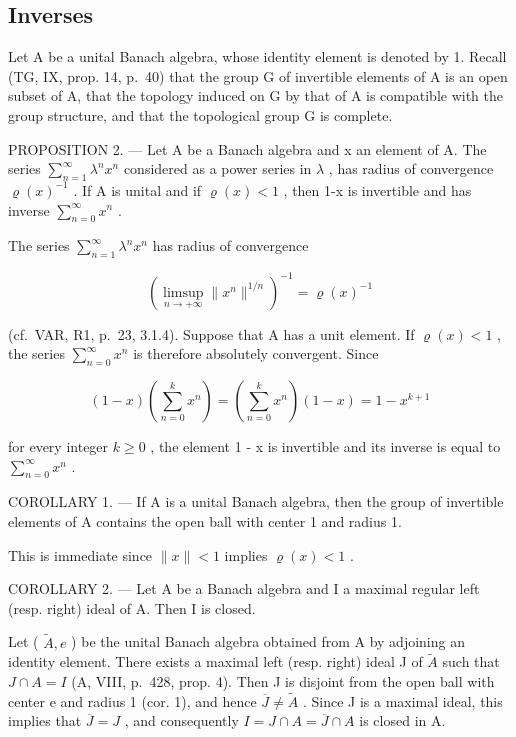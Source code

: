 \subsection{Inverses}

Let A be a unital Banach algebra, whose identity element is denoted by 1. Recall (TG, IX, prop. 14, p.~40) that the group G of invertible elements of A is an open subset of A, that the topology induced on G by that of A is compatible with the group structure, and that the topological group G is complete.

PROPOSITION 2. --- Let A be a Banach algebra and x an element of A. The series \(\sum_{n=1}^{\infty}\lambda^{n}x^{n}\) considered as a power series in \(\lambda\) , has radius of convergence \(\varrho(x)^{-1}\) . If A is unital and if \(\varrho(x)<1\) , then 1-x is invertible and has inverse \(\sum_{n=0}^{\infty}x^{n}\) .

The series \(\sum_{n=1}^{\infty}\lambda^{n}x^{n}\) has radius of convergence

\[
(\limsup _ {n \to + \infty} \| x ^ {n} \| ^ {1 / n}) ^ {- 1} = \varrho (x) ^ {- 1}
\]

(cf.~VAR, R1, p.~23, 3.1.4). Suppose that A has a unit element. If \(\varrho(x) < 1\) , the series \(\sum_{n=0}^{\infty} x^n\) is therefore absolutely convergent. Since

\[
(1 - x) \left(\sum_ {n = 0} ^ {k} x ^ {n}\right) = \left(\sum_ {n = 0} ^ {k} x ^ {n}\right) (1 - x) = 1 - x ^ {k + 1}
\]

for every integer \(k \geqslant 0\) , the element 1 - x is invertible and its inverse is equal to \(\sum_{n=0}^{\infty} x^{n}\) .

COROLLARY 1. --- If A is a unital Banach algebra, then the group of invertible elements of A contains the open ball with center 1 and radius 1.

This is immediate since \(\|x\| < 1\) implies \(\varrho(x) < 1\) .

COROLLARY 2. --- Let A be a Banach algebra and I a maximal regular left (resp. right) ideal of A. Then I is closed.

Let ( \(\tilde{A}, e\) ) be the unital Banach algebra obtained from A by adjoining an identity element. There exists a maximal left (resp. right) ideal J of \(\tilde{A}\) such that \(J \cap A = I\) (A, VIII, p.~428, prop. 4). Then J is disjoint from the open ball with center e and radius 1 (cor. 1), and hence \(\overline{J} \neq \widetilde{A}\) . Since J is a maximal ideal, this implies that \(\overline{J} = J\) , and consequently \(I = J \cap A = \overline{J} \cap A\) is closed in A.

